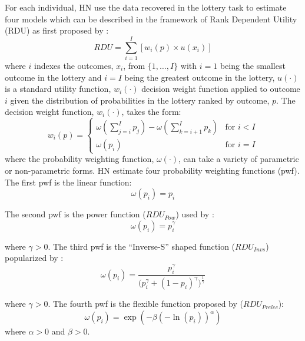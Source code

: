 \documentclass[../main.tex]{subfiles}
\begin{document}
For each individual, HN use the data recovered in the lottery task to estimate four models which can be described in the framework of Rank Dependent Utility (RDU) as first proposed by \textcite{Quiggin1982}:
\begin{equation}
	\label{eq4:RDU}
	RDU = \sum_{i=1}^{I} \left[ w_i(p) \times u(x_i) \right]
\end{equation}
\noindent where $i$ indexes the outcomes, $x_i$, from $\{1,\ldots,I\}$ with $i=1$ being the smallest outcome in the lottery and $i=I$ being the greatest outcome in the lottery, $u(\cdot)$ is a standard utility function, $w_i(\cdot)$ decision weight function applied to outcome $i$ given the distribution of probabilities in the lottery ranked by outcome, $p$.
The decision weight function, $w_i(\cdot)$, takes the form:
\begin{equation}
	\label{eq4:dweight}
	w_i(p) =
	\begin{cases}
		\omega\left(\displaystyle\sum_{j=i}^I p_j\right) - \omega\left(\displaystyle\sum_{k=i+1}^I p_k\right) & \text{for } i<I \\
		\omega(p_i) & \text{for } i = I
	\end{cases}
\end{equation}
\noindent where the probability weighting function, $\omega(\cdot)$, can take a variety of parametric or non-parametric forms.
HN estimate four probability weighting functions (pwf).
The first pwf is the linear function:
\begin{equation}
	\label{eq4:pw:eut}
	\omega(p_i) = p_i
\end{equation}

\noindent The second pwf is the power function ($\mathit{RDU_{Pow}}$) used by \textcite{Quiggin1982}:
\begin{equation}
	\label{eq4:pw:pow}
	\omega(p_i)=p_i^\gamma
\end{equation}

\noindent where $\gamma > 0$. 
The third pwf is the \enquote{Inverse-S} shaped function ($\mathit{RDU_{Invs}}$) popularized by \textcite{Tversky1992}:
\begin{equation}
	\label{eq4:pw:inv}
	\omega(p_i) = \frac{p_i^\gamma}{\biggl(p_i^\gamma + {(1-p_i)}^\gamma\biggr)^{ \frac{1}{\gamma} } }
\end{equation}

\noindent where $\gamma > 0$. 
The fourth pwf is the flexible function proposed by \textcite{Prelec1998} ($\mathit{RDU_{Prelec}}$):
\begin{equation}
	\label{eq4:pw:pre}
	\omega(p_i)=\exp(-\beta(-\ln(p_i))^\alpha)
\end{equation}
\noindent where $\alpha > 0$ and $\beta > 0$.
\end{document}
